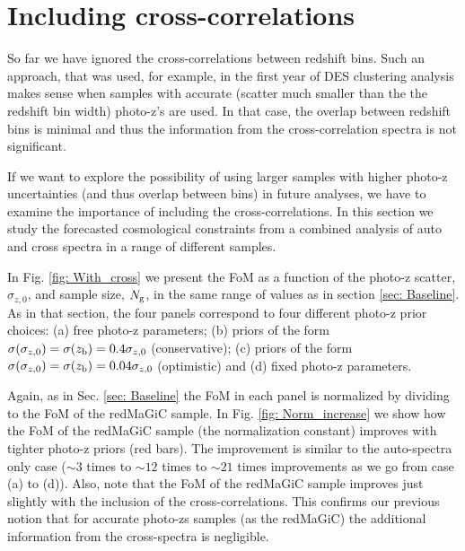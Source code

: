\documentclass[a4paper,fleqn,usenatbib]{mnras}
\begin{document}
\section{Including cross-correlations}
\label{sec: Cross_correlations}

So far we have ignored the cross-correlations between redshift bins. Such an approach, that was used, for example, in the first year of DES clustering analysis makes sense when samples with accurate (scatter much smaller than the the redshift bin width) photo-z's are used. In that case, the overlap between redshift bins is minimal and thus the information from the cross-correlation spectra is not significant.

If we want to explore the possibility of using larger samples with higher photo-z uncertainties (and thus overlap between bins) in future analyses, we have to examine the importance of including the cross-correlations. In this section we study the forecasted cosmological constraints from a combined analysis of auto and cross spectra in a range of different samples.

\begin{figure*}
\centering

\caption{Similar to Fig. \ref{fig: Baseline}, but now including the cross-correlations between bins when forecasting the cosmological constraints from different samples.}
\label{fig: With_cross}
\end{figure*}


In Fig. \ref{fig: With_cross} we present the FoM as a function of the photo-z scatter, $\sigma_{z,0}$,  and sample size, $N_{\mbox{\scriptsize{g}}}$, in the same range of values as in section \ref{sec: Baseline}. As in that section, the four panels  correspond to four different photo-z prior choices: (a) free photo-z parameters; (b) priors of the form $\sigma(\sigma_{z,0}) = \sigma(z_{\mbox{\scriptsize{b}}}) = 0.4  \sigma_{z,0}$ (conservative); (c) priors of the form $\sigma(\sigma_{z,0}) = \sigma(z_{\mbox{\scriptsize{b}}}) = 0.04  \sigma_{z,0}$ (optimistic)  and (d) fixed photo-z parameters.

Again, as in Sec. \ref{sec: Baseline} the FoM in each panel is normalized by dividing to the FoM of the redMaGiC sample. In Fig. \ref{fig: Norm_increase}  we show how the FoM of the redMaGiC sample (the normalization constant) improves with tighter photo-z priors (red bars). The improvement is similar to the auto-spectra only case ($\sim 3$ times to $\sim 12$ times to $\sim 21$ times improvements as we go from case (a) to (d)). Also, note that the FoM of the redMaGiC sample improves just slightly with the inclusion of the cross-correlations. This confirms our previous notion that for accurate photo-zs samples (as the redMaGiC) the additional information from the cross-spectra is negligible.
\end{document}
